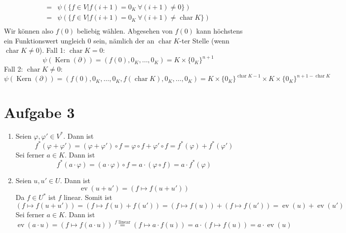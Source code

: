 \documentclass{article}
\begin{document}
\begin{enumerate}[(a)]
\begin{align*}
		=&\psi(\{f\in V| f(i+1) = 0_K\ \forall (i+1) \neq 0\})\\
		=&\psi(\{f\in V| f(i+1) = 0_K\ \forall (i+1) \neq \operatorname{char} K\})\\
		\end{align*}
		Wir können also $f(0)$ beliebig wählen. Abgesehen von $f(0)$ kann höchstens ein Funktionswert ungleich 0 sein, nämlich der an $\operatorname{char} K$-ter Stelle (wenn $\operatorname{char} K \neq 0$).
		Fall 1: $\operatorname{char} K = 0$: 
		\[\psi(\operatorname{Kern}(\partial)) = (f(0), 0_K, \dots, 0_K) = K\times \{0_K\}^{n+1}\]
		Fall 2: $\operatorname{char} K \neq 0$: 
		\[\psi(\operatorname{Kern}(\partial)) = (f(0), 0_K, \dots, 0_K, f(\operatorname{char} K), 0_K, \dots, 0_K) = K\times \{0_K\}^{\operatorname{char}K - 1} \times K\times \{0_K\}^{n + 1 - \operatorname{char} K}\]
	\end{enumerate}
	\section*{Aufgabe 3}
	\begin{enumerate}
		\item Seien $\varphi, \varphi' \in V^*$. Dann ist
		\[f^*(\varphi + \varphi') = (\varphi + \varphi') \circ f = \varphi \circ f + \varphi'\circ f = f^*(\varphi) + f^*(\varphi')\]
		Sei ferner $a\in K$. Dann ist
		\[f^*(a\cdot \varphi) = (a\cdot \varphi)\circ f = a \cdot (\varphi \circ f) = a \cdot f^*(\varphi)\]
		\item Seien $u, u'\in U$. Dann ist
		\[\operatorname{ev}(u + u') = (f \mapsto f(u+u'))\]
		Da $f\in U^*$ ist $f$ linear. Somit ist
		\[(f \mapsto f(u+u')) = (f \mapsto f(u) + f(u')) = (f \mapsto f(u)) + (f\mapsto f(u')) = \operatorname{ev}(u) + \operatorname{ev}(u')\]
		Sei ferner $a\in K$. Dann ist
		\[\operatorname{ev}(a \cdot u) = (f\mapsto f(a\cdot u)) \overset{f \text{ linear}}{=} (f\mapsto a \cdot f(u)) = a \cdot (f \mapsto f(u)) = a \cdot \operatorname{ev}(u)\]
	\end{enumerate}
\end{document}
